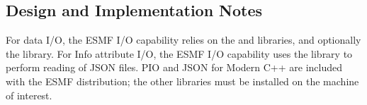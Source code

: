 
\subsection{Design and Implementation Notes}

For data I/O, the ESMF I/O capability relies on the
 and
libraries, and optionally the
library.  For Info attribute I/O, the ESMF I/O capability uses the
library to perform reading of JSON files. PIO and JSON for Modern C++
are included with the ESMF distribution; the other libraries must be
installed on the machine of interest.
